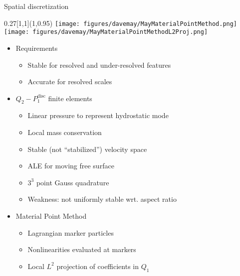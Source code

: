 \documentclass{beamer}
\begin{document}
\begin{frame}{Spatial discretization}
  \begin{textblock}{0.27}[1,1](1,0.95)
    \texttt{[image: figures/davemay/MayMaterialPointMethod.png]} \\
    \texttt{[image: figures/davemay/MayMaterialPointMethodL2Proj.png]}
  \end{textblock}
  \begin{itemize}
  \item Requirements
    \begin{itemize}
    \item Stable for resolved and under-resolved features
    \item Accurate for resolved scales
    \end{itemize}
  \item $Q_2-P_1^{\text{disc}}$ finite elements
    \begin{itemize}
    \item Linear pressure to represent hydrostatic mode
    \item Local mass conservation
    \item Stable (not ``stabilized'') velocity space
    \item ALE for moving free surface
    \item $3^3$ point Gauss quadrature
    \item Weakness: not uniformly stable wrt. aspect ratio
    \end{itemize}
  \item Material Point Method
    \begin{itemize}
    \item Lagrangian marker particles
    \item Nonlinearities evaluated at markers
    \item Local $L^2$ projection of coefficients in $Q_1$
    \end{itemize}
  \end{itemize}
\end{frame}
\end{document}
